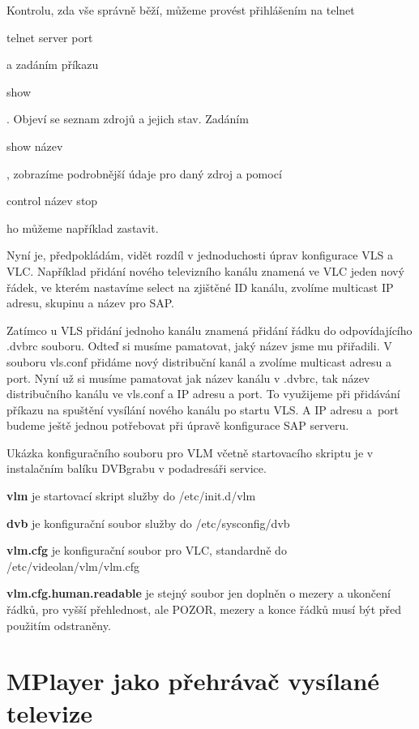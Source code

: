 Kontrolu, zda vše správně běží, můžeme provést přihlášením na telnet \begin{small}telnet server port\end{small} a zadáním příkazu \begin{small}show\end{small}. Objeví se seznam zdrojů a jejich stav. Zadáním \begin{small}show název\end{small}, zobrazíme podrobnější údaje pro daný zdroj a pomocí \begin{small}control název stop\end{small} ho můžeme například zastavit.

Nyní je, předpokládám, vidět rozdíl v jednoduchosti úprav konfigurace VLS a VLC. Například přidání nového televizního kanálu znamená ve VLC jeden nový řádek, ve kterém nastavíme select na zjištěné ID kanálu, zvolíme multicast IP adresu, skupinu a název pro SAP.

Zatímco u VLS přidání jednoho kanálu znamená přidání řádku do odpovídajícího .dvbrc souboru. Odteď si musíme pamatovat, jaký název jsme mu přiřadili. V souboru vls.conf přidáme nový distribuční kanál a zvolíme multicast adresu a port. Nyní už si musíme pamatovat jak název kanálu v .dvbrc, tak název distribučního kanálu ve vls.conf a IP adresu a port. To využijeme při přidávání příkazu na spuštění vysílání nového kanálu po startu VLS. A IP adresu a~port budeme ještě jednou potřebovat při úpravě konfigurace SAP serveru.

Ukázka konfiguračního souboru pro VLM včetně startovacího skriptu je v instalačním balíku DVBgrabu v podadresáři service.
\bitem
\item \textbf{vlm} je startovací skript služby do /etc/init.d/vlm
\item \textbf{dvb} je konfigurační soubor služby do /etc/sysconfig/dvb
\item \textbf{vlm.cfg} je konfigurační soubor pro VLC, standardně do /etc/videolan/vlm/vlm.cfg
\item \textbf{vlm.cfg.human.readable} je stejný soubor jen doplněn o mezery a ukončení řádků, pro vyšší přehlednost, ale POZOR, mezery a konce řádků musí být před použitím odstraněny.
\eitem

\section {MPlayer jako přehrávač vysílané televize}

